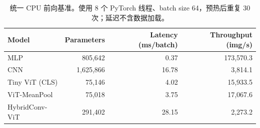 \begin{table}[H]
  \centering
  \small
  \caption{统一 CPU 前向基准。使用 8 个 PyTorch 线程、batch size 64，预热后重复 30 次；延迟不含数据加载。}
  \label{tab:cpu-benchmark}
  \renewcommand{\arraystretch}{1.12}
  \begin{tabular}{lrrr}
    \toprule
    Model & Parameters & Latency (ms/batch) & Throughput (img/s) \\
    \midrule
    MLP & 805,642 & 0.37 & 173,570.3 \\
    CNN & 1,625,866 & 16.78 & 3,814.1 \\
    Tiny ViT (CLS) & 75,146 & 4.02 & 15,933.5 \\
    ViT-MeanPool & 75,018 & 3.75 & 17,067.6 \\
    HybridConv-ViT & 291,402 & 28.15 & 2,273.2 \\
    \bottomrule
  \end{tabular}
\end{table}
